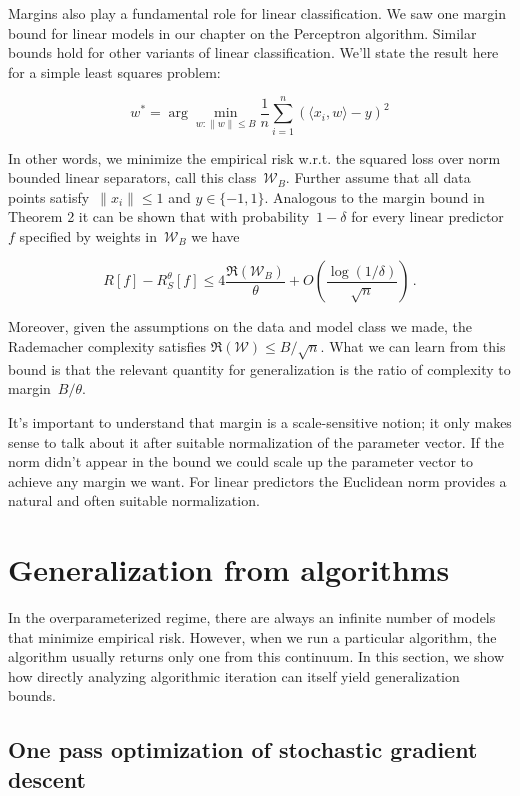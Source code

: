\documentclass{tufte-book}
\begin{document}
Margins also play a fundamental role for linear classification. We saw
one margin bound for linear models in our chapter on the Perceptron
algorithm. Similar bounds hold for other variants of linear
classification. We'll state the result here for a simple least squares
problem:

\[
w^* = \arg\min_{w\colon\|w\|\le B} \frac1n\sum_{i=1}^n\left(\langle x_i, w\rangle - y\right)^2
\]

In other words, we minimize the empirical risk w.r.t. the squared loss
over norm bounded linear separators, call this class~\(\mathcal{W}_B\).
Further assume that all data points satisfy~\(\|x_i\|\le 1\) and
\(y\in\{-1,1\}.\) Analogous to the margin bound in Theorem 2 it can be
shown that with probability~\(1-\delta\) for every linear
predictor~\(f\) specified by weights in~\(\mathcal{W}_B\) we have

\[
R[f]
- R_S^\theta[f]
\le 4\frac{{\mathfrak{R}}(\mathcal{W}_B)}{\theta}
+ O\left(\frac{\log(1/\delta)}{\sqrt{n}}\right)\,.
\]

Moreover, given the assumptions on the data and model class we made, the
Rademacher complexity satisfies
\({\mathfrak{R}}(\mathcal{W})\le B/\sqrt{n}.\) What we can learn from
this bound is that the relevant quantity for generalization is the ratio
of complexity to margin~\(B/\theta\).

It's important to understand that margin is a scale-sensitive notion; it
only makes sense to talk about it after suitable normalization of the
parameter vector. If the norm didn't appear in the bound we could scale
up the parameter vector to achieve any margin we want. For linear
predictors the Euclidean norm provides a natural and often suitable
normalization.

\hypertarget{generalization-from-algorithms}{%
\section{Generalization from
algorithms}\label{generalization-from-algorithms}}

In the overparameterized regime, there are always an infinite number of
models that minimize empirical risk. However, when we run a particular
algorithm, the algorithm usually returns only one from this continuum.
In this section, we show how directly analyzing algorithmic iteration
can itself yield generalization bounds.

\hypertarget{one-pass-optimization-of-stochastic-gradient-descent}{%
\subsection{One pass optimization of stochastic gradient
descent}\label{one-pass-optimization-of-stochastic-gradient-descent}}
\end{document}
